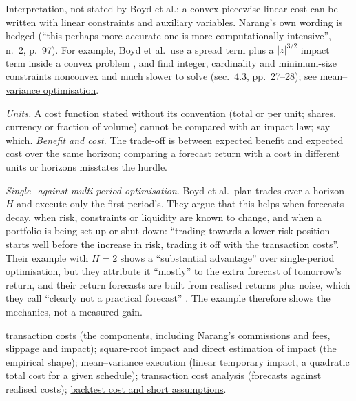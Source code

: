 \begin{qfmodel}
Interpretation, not stated by Boyd et al.: a convex piecewise-linear cost can be written with linear constraints and auxiliary variables. Narang's own wording is hedged (``this perhaps more accurate one is more computationally intensive'', n.~2, p.~97). For example, Boyd et al.\ use a spread term plus a $\lvert z\rvert^{3/2}$ impact term inside a convex problem \citep[author version of 5 Jan.\ 2024, sec.~2.4, eq.~(10), p.~17]{wide-boyd-markowitz-seventy}, and find integer, cardinality and minimum-size constraints nonconvex and much slower to solve (sec.~4.3, pp.~27--28); see \hyperref[mod:mean-variance-portfolio-optimisation]{mean--variance optimisation}.

\emph{Units.} A cost function stated without its convention (total or per unit; shares, currency or fraction of volume) cannot be compared with an impact law; say which. \emph{Benefit and cost.} The trade-off is between expected benefit and expected cost over the same horizon; comparing a forecast return with a cost in different units or horizons misstates the hurdle.

\emph{Single- against multi-period optimisation}. Boyd et al.\ plan trades over a horizon $H$ and execute only the first period's. They argue that this helps when forecasts decay, when risk, constraints or liquidity are known to change, and when a portfolio is being set up or shut down: ``trading towards a lower risk position starts well before the increase in risk, trading it off with the transaction costs''. Their example with $H=2$ shows a ``substantial advantage'' over single-period optimisation, but they attribute it ``mostly'' to the extra forecast of tomorrow's return, and their return forecasts are built from realised returns plus noise, which they call ``clearly not a practical forecast'' \citep[secs.~5.2 and~7.4, pp.~46--47 and~66--69]{exp-boyd-multiperiod-trading}. The example therefore shows the mechanics, not a measured gain.

 \hyperref[def:transaction-costs]{transaction costs} (the components, including Narang's commissions and fees, slippage and impact); \hyperref[ev:square-root-impact]{square-root impact} and \hyperref[meth:almgren-impact-estimation]{direct estimation of impact} (the empirical shape); \hyperref[mod:almgren-chriss-execution]{mean--variance execution} (linear temporary impact, a quadratic total cost for a given schedule); \hyperref[meth:transaction-cost-analysis]{transaction cost analysis} (forecasts against realised costs); \hyperref[pit:backtest-cost-short-assumptions]{backtest cost and short assumptions}.


\end{qfmodel}
